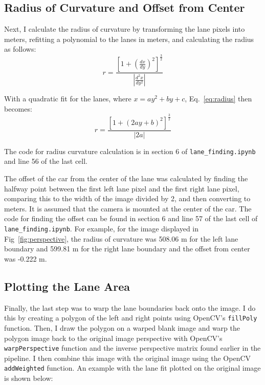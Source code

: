 \documentclass[12pt]{article}
\begin{document}
\subsection{Radius of Curvature and Offset from Center}
Next, I calculate the radius of curvature by transforming the lane pixels into meters, refitting a polynomial to the lanes in meters, and calculating the radius as follows:
\begin{equation}
r = \frac{[1+(\frac{dx}{dy})^2]^\frac{3}{2}}{|\frac{d^2x}{dy^2}|}
\label{eq:radius}
\end{equation}

With a quadratic fit for the lanes, where $x = ay^2 + by + c$, Eq.~\ref{eq:radius} then becomes:
\begin{equation}
r = \frac{[1+(2ay + b)^2]^\frac{3}{2}}{|2a|}
\end{equation}

The code for radius curvature calculation is in section 6 of \texttt{lane\_finding.ipynb} and line 56 of the last cell.

The offset of the car from the center of the lane was calculated by finding the halfway point between the first left lane pixel and the first right lane pixel, comparing this to the width of the image divided by 2, and then converting to meters. It is assumed that the camera is mounted at the center of the car. The code for finding the offset can be found in section 6 and line 57 of the last cell of \texttt{lane\_finding.ipynb}. For example, for the image displayed in Fig~\ref{fig:perspective}, the radius of curvature was 508.06 m for the left lane boundary and 599.81 m for the right lane boundary and the offset from center was -0.222 m.

\subsection{Plotting the Lane Area}
Finally, the last step was to warp the lane boundaries back onto the image. I do this by creating a polygon of the left and right points using OpenCV's \texttt{fillPoly} function. Then, I draw the polygon on a warped blank image and warp the polygon image back to the original image perspective with OpenCV's \texttt{warpPerspective} function and the inverse perspective matrix found earlier in the pipeline. I then combine this image with the original image using the OpenCV \texttt{addWeighted} function. An example with the lane fit plotted on the original image is shown below:
\end{document}
